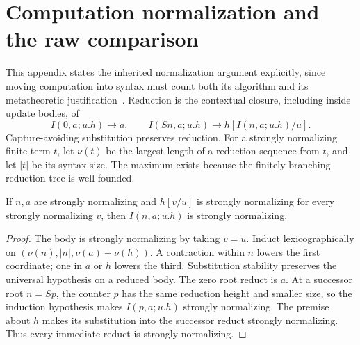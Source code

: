 \section{Computation normalization and the raw comparison}
\label{sec:normalization}

This appendix states the inherited normalization argument explicitly, since
moving computation into syntax must count both its algorithm and its
metatheoretic justification~\cite{normalization,prior}. Reduction is the
contextual closure, including inside update bodies, of
\[
 I(0,a;u.h)\to a,\qquad I(Sn,a;u.h)\to h[I(n,a;u.h)/u].
\]
Capture-avoiding substitution preserves reduction. For a strongly normalizing
finite term $t$, let $\nu(t)$ be the largest length of a reduction sequence
from $t$, and let $|t|$ be its syntax size. The maximum exists because the
finitely branching reduction tree is well founded.

\begin{lemma}
If $n,a$ are strongly normalizing and $h[v/u]$ is strongly normalizing for
every strongly normalizing $v$, then $I(n,a;u.h)$ is strongly normalizing.
\end{lemma}
\begin{proof}
The body is strongly normalizing by taking $v=u$. Induct lexicographically
on $(\nu(n),|n|,\nu(a)+\nu(h))$. A contraction within $n$ lowers the first
coordinate; one in $a$ or $h$ lowers the third. Substitution stability
preserves the universal hypothesis on a reduced body. The zero root reduct
is $a$. At a successor root $n=Sp$, the counter $p$ has the same reduction
height and smaller size, so the induction hypothesis makes $I(p,a;u.h)$
strongly normalizing. The premise about $h$ makes its substitution into
the successor reduct strongly normalizing. Thus every immediate reduct is
strongly normalizing.
\end{proof}

